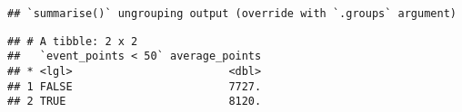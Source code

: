 \documentclass[]{article}
\begin{document}
\begin{verbatim}
## `summarise()` ungrouping output (override with `.groups` argument)
\end{verbatim}

\begin{verbatim}
## # A tibble: 2 x 2
##   `event_points < 50` average_points
## * <lgl>                        <dbl>
## 1 FALSE                        7727.
## 2 TRUE                         8120.
\end{verbatim}
\end{document}
